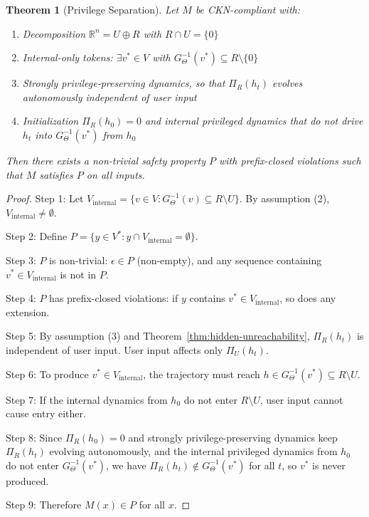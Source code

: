 \documentclass[11pt,a4paper]{article}
\newtheorem{theorem}{Theorem}[section]
\begin{document}
\begin{theorem}[Privilege Separation]
\label{thm:privilege-sep}
Let $M$ be CKN-compliant with:
\begin{enumerate}
    \item Decomposition $\mathbb{R}^n = U \oplus R$ with $R \cap U = \{0\}$
    \item Internal-only tokens: $\exists v^* \in V$ with $G_\Theta^{-1}(v^*) \subseteq R \setminus \{0\}$
    \item Strongly privilege-preserving dynamics, so that $\Pi_R(h_t)$ evolves autonomously independent of user input
    \item Initialization $\Pi_R(h_0) = 0$ and internal privileged dynamics that do not drive $h_t$ into $G_\Theta^{-1}(v^*)$ from $h_0$
\end{enumerate}
Then there exists a non-trivial safety property $P$ with prefix-closed violations such that $M$ satisfies $P$ on all inputs.
\end{theorem}

\begin{proof}
Step 1: Let $V_{\text{internal}} = \{v \in V : G_\Theta^{-1}(v) \subseteq R \setminus U\}$. By assumption (2), $V_{\text{internal}} \neq \emptyset$.

Step 2: Define $P = \{y \in V^* : y \cap V_{\text{internal}} = \emptyset\}$.

Step 3: $P$ is non-trivial: $\epsilon \in P$ (non-empty), and any sequence containing $v^* \in V_{\text{internal}}$ is not in $P$.

Step 4: $P$ has prefix-closed violations: if $y$ contains $v^* \in V_{\text{internal}}$, so does any extension.

Step 5: By assumption (3) and Theorem~\ref{thm:hidden-unreachability}, $\Pi_R(h_t)$ is independent of user input. User input affects only $\Pi_U(h_t)$.

Step 6: To produce $v^* \in V_{\text{internal}}$, the trajectory must reach $h \in G_\Theta^{-1}(v^*) \subseteq R \setminus U$.

Step 7: If the internal dynamics from $h_0$ do not enter $R \setminus U$, user input cannot cause entry either.

Step 8: Since $\Pi_R(h_0) = 0$ and strongly privilege-preserving dynamics keep $\Pi_R(h_t)$ evolving autonomously, and the internal privileged dynamics from $h_0$ do not enter $G_\Theta^{-1}(v^*)$, we have $\Pi_R(h_t) \notin G_\Theta^{-1}(v^*)$ for all $t$, so $v^*$ is never produced.

Step 9: Therefore $M(x) \in P$ for all $x$.
\end{proof}
\end{document}
